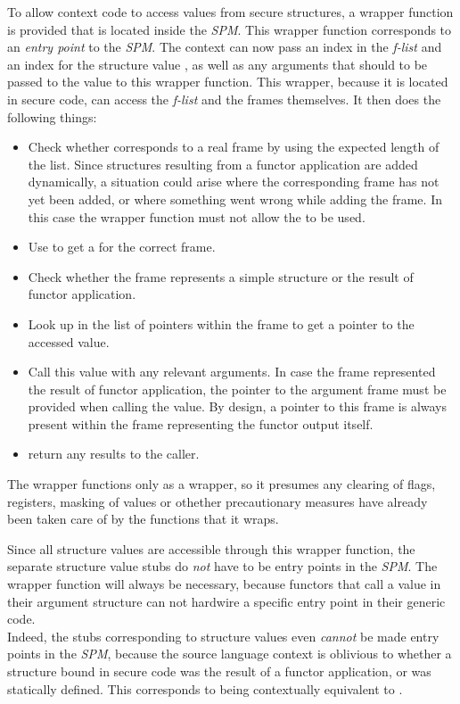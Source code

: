 To allow context code to access values from secure structures, a wrapper function is provided that is located inside the \emph{SPM}.
This wrapper function corresponds to an \emph{entry point} to the \emph{SPM}.
The context can now pass an index in the \emph{f-list}  and an index for the structure value , as well as any arguments that should to be passed to the value to this wrapper function.
This wrapper, because it is located in secure code, can access the \emph{f-list} and the frames themselves.
It then does the following things:
\begin{itemize}
\item Check whether  corresponds to a real frame by using the expected length of the list.
Since structures resulting from a functor application are added dynamically, a situation could arise where the corresponding frame has not yet been added, or where something went wrong while adding the frame.
In this case the wrapper function must not allow the  to be used.
\item Use  to get a  for the correct frame.
\item Check whether the frame represents a simple structure or the result of functor application.
\item Look up  in the list of pointers within the frame to get a pointer to the accessed value.
\item Call this value with any relevant arguments.
In case the frame represented the result of functor application, the pointer to the argument frame must be provided when calling the value.
By design, a pointer to this frame is always present within the frame representing the functor output itself.
\item return any results to the caller.
\end{itemize}

The wrapper functions only as a wrapper, so it presumes any clearing of flags, registers, masking of values or othether precautionary measures have already been taken care of by the functions that it wraps.

Since all structure values are accessible through this wrapper function, the separate structure value stubs do \emph{not} have to be entry points in the \emph{SPM}. The wrapper function will always be necessary, because functors that call a value in their argument structure can not hardwire a specific entry point in their generic code.
\\[1em]
Indeed, the stubs corresponding to structure values even \emph{cannot} be made entry points in the \emph{SPM}, because the source language context is oblivious to whether a structure bound in secure code was the result of a functor application, or was statically defined. This corresponds to  being contextually equivalent to .


